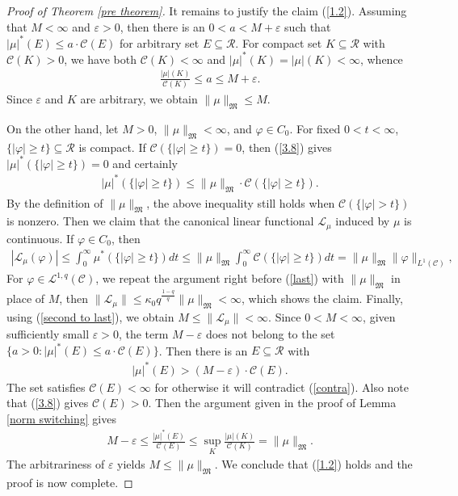 \documentclass[10pt,reqno]{amsart}
\numberwithin{equation}{section}
\begin{document}
\begin{proof}[Proof of Theorem \ref{pre theorem}]
It remains to justify the claim (\ref{1.2}). Assuming that $M<\infty$ and $\varepsilon>0$, then there is an $0<a<M+\varepsilon$ such that $|\mu|^{\ast}(E)\leq a\cdot\mathcal{C}(E)$ for arbitrary set $E\subseteq\mathcal{R}$. For compact set $K\subseteq\mathcal{R}$ with $\mathcal{C}(K)>0$, we have both $\mathcal{C}(K)<\infty$ and $|\mu|^{\ast}(K)=|\mu|(K)<\infty$, whence 
\begin{align*}
\frac{|\mu|(K)}{\mathcal{C}(K)}\leq a\leq M+\varepsilon.
\end{align*}
Since $\varepsilon$ and $K$ are arbitrary, we obtain $\|\mu\|_{\mathfrak{M}}\leq M$. 

On the other hand, let $M>0$, $\|\mu\|_{\mathfrak{M}}<\infty$, and $\varphi\in C_{0}$. For fixed $0<t<\infty$, $\{|\varphi|\geq t\}\subseteq\mathcal{R}$ is compact. If $\mathcal{C}(\{|\varphi|\geq t\})=0$, then (\ref{3.8}) gives $|\mu|^{\ast}(\{|\varphi|\geq t\})=0$ and certainly
\begin{align*}
|\mu|^{\ast}(\{|\varphi|\geq t\})\leq\|\mu\|_{\mathfrak{M}}\cdot\mathcal{C}(\{|\varphi|\geq t\}).
\end{align*}
By the definition of $\|\mu\|_{\mathfrak{M}}$, the above inequality still holds when $\mathcal{C}(\{|\varphi|>t\})$ is nonzero. Then we claim that the canonical linear functional $\mathcal{L}_{\mu}$ induced by $\mu$ is continuous. If $\varphi\in C_{0}$, then
\begin{align*}
|\mathcal{L}_{\mu}(\varphi)|\leq\int_{0}^{\infty}\mu^{\ast}(\{|\varphi|\geq t\})dt\leq\|\mu\|_{\mathfrak{M}}\int_{0}^{\infty}\mathcal{C}(\{|\varphi|\geq t\})dt=\|\mu\|_{\mathfrak{M}}\|\varphi\|_{L^{1}(\mathcal{C})},
\end{align*}
For $\varphi\in\mathcal{L}^{1,q}(\mathcal{C})$, we repeat the argument right before (\ref{last}) with $\|\mu\|_{\mathfrak{M}}$ in place of $M$, then $\|\mathcal{L}_{\mu}\|\leq \kappa_{0}q^{\frac{1-q}{q}}\|\mu\|_{\mathfrak{M}}<\infty$, which shows the claim. Finally, using (\ref{second to last}), we obtain $M\leq\|\mathcal{L}_{\mu}\|<\infty$. Since $0<M<\infty$, given sufficiently small $\varepsilon>0$, the term $M-\varepsilon$ does not belong to the set $\{a>0: |\mu|^{\ast}(E)\leq a\cdot\mathcal{C}(E)\}$. Then there is an $E\subseteq\mathcal{R}$ with
\begin{align}\label{contra}
|\mu|^{\ast}(E)>(M-\varepsilon)\cdot\mathcal{C}(E). 
\end{align}
The set satisfies $\mathcal{C}(E)<\infty$ for otherwise it will contradict (\ref{contra}). Also note that (\ref{3.8}) gives $\mathcal{C}(E)>0$. Then the argument given in the proof of Lemma \ref{norm switching} gives 
\begin{align*}
M-\varepsilon\leq\frac{|\mu|^{\ast}(E)}{\mathcal{C}(E)}\leq\sup_{K}\frac{|\mu|(K)}{\mathcal{C}(K)}=\|\mu\|_{\mathfrak{M}}.
\end{align*}
The arbitrariness of $\varepsilon$ yields $M\leq\|\mu\|_{\mathfrak{M}}$. We conclude that (\ref{1.2}) holds and the proof is now complete.
\end{proof}
\end{document}
